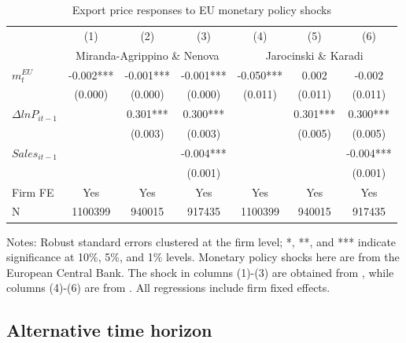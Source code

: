 \begin{table}[htbp]
    \centering
    \caption{Export price responses to EU monetary policy shocks}
    \begin{threeparttable}
    \begin{tabular}{lcccccc}
        \toprule
        & (1)   & (2)   & (3)   & (4)   & (5)   & (6) \\
        & \multicolumn{3}{c}{Miranda-Agrippino \& Nenova} & \multicolumn{3}{c}{Jarocinski \& Karadi}  \\
        \midrule
        $m^{EU}_t$ & -0.002*** & -0.001*** & -0.001*** & -0.050*** & 0.002 & -0.002 \\
              & (0.000) & (0.000) & (0.000) & (0.011) & (0.011) & (0.011)\\  
        $\Delta ln P_{it-1}$ &       & 0.301*** & 0.300*** &       & 0.301*** & 0.300*** \\
              &       & (0.003) & (0.003) &       & (0.005) & (0.005) \\
        $Sales_{it-1}$ &       &       & -0.004*** &       &       & -0.004*** \\
              &       &       & (0.001) &       &       & (0.001) \\
        \midrule
        Firm FE & Yes   & Yes   & Yes   & Yes   & Yes   & Yes \\
         N     & 1100399 & 940015 & 917435 & 1100399 & 940015 & 917435 \\
        \bottomrule
    \end{tabular}
        \begin{tablenotes}
            \footnotesize
            \item Notes: Robust standard errors clustered at the firm level;  *, **, and *** indicate significance at 10\%, 5\%, and 1\% levels. Monetary policy shocks here are from the European Central Bank. The shock in columns (1)-(3) are obtained from \cite{miranda2022tale}, while columns (4)-(6) are  from \cite{jarocinski2020deconstructing}. All regressions include firm fixed effects.
	\end{tablenotes}
    \end{threeparttable}
    \label{tab.EU}
\end{table}

\subsection{Alternative time horizon}

